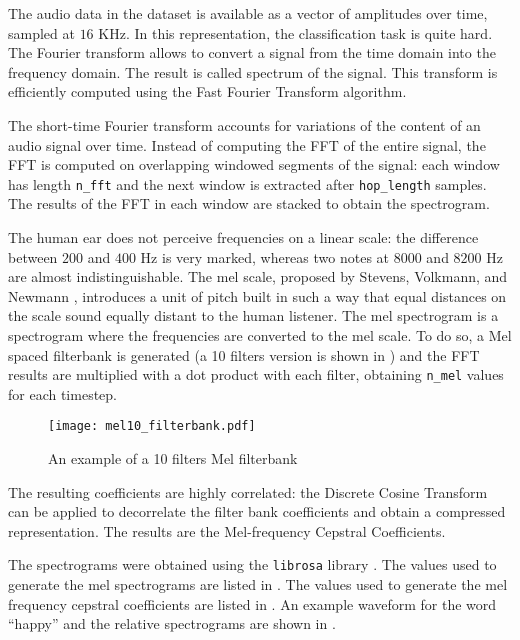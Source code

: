 The audio data in the dataset is available as a vector of amplitudes over time,
sampled at $16$ KHz. In this representation, the classification task is quite
hard.
The Fourier transform allows to convert a signal from the time domain into the
frequency domain. The result is called spectrum of the signal. This transform
is efficiently computed using the Fast Fourier Transform algorithm.

The short-time Fourier transform accounts for variations of the content of an
audio signal over time. Instead of computing the FFT of the entire signal, the
FFT is computed on overlapping windowed segments of the signal: each window has
length \texttt{n\_fft} and the next window is extracted after
\texttt{hop\_length} samples.
The results of the FFT in each window are stacked to obtain the spectrogram.

The human ear does not perceive frequencies on a linear scale: the difference
between $200$ and $400$ Hz is very marked, whereas two notes at $8000$ and
$8200$ Hz are almost indistinguishable. The mel scale, proposed by Stevens,
Volkmann, and Newmann \cite{melscale1937}, introduces a unit of pitch built in
such a way that equal distances on the scale sound equally distant to the human
listener.
The mel spectrogram is a spectrogram where the frequencies are converted to the
mel scale. To do so, a Mel spaced filterbank is generated (a 10 filters version
is shown in ) and the FFT results are multiplied with
a dot product with each filter, obtaining \texttt{n\_mel} values for each
timestep.

\begin{figure}[t!]
    \centering
    \texttt{[image: mel10\_filterbank.pdf]}
    \caption{An example of a 10 filters Mel filterbank}
    \label{fig:mel10_filterbank}
\end{figure}

The resulting coefficients are highly correlated: the Discrete Cosine Transform
can be applied to decorrelate the filter bank coefficients and obtain a
compressed representation.
The results are the Mel-frequency Cepstral Coefficients.

The spectrograms were obtained using the \texttt{librosa} library \cite{brian_mcfee_2020_3955228}.
The values used to generate the mel spectrograms are listed in
.
The values used to generate the mel frequency cepstral coefficients are listed
in .
An example waveform for the word ``happy'' and the relative spectrograms are
shown in .

